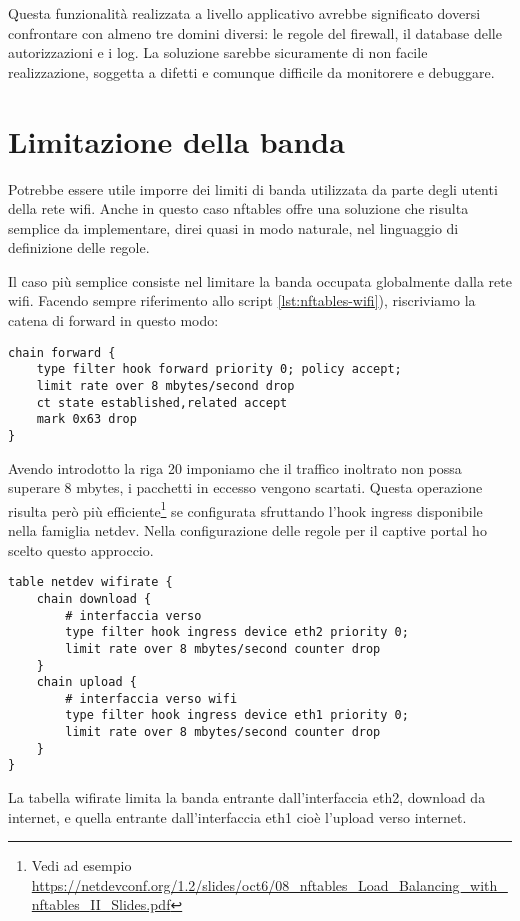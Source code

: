 Questa funzionalit\`a realizzata a livello applicativo avrebbe significato
doversi confrontare con almeno tre domini diversi: le regole del firewall, il
database delle autorizzazioni e i log. La soluzione sarebbe sicuramente di non
facile realizzazione, soggetta a difetti e comunque difficile da monitorere e
debuggare.

\section{Limitazione della banda}

Potrebbe essere utile imporre dei limiti di banda utilizzata da parte degli
utenti della rete wifi. Anche in questo caso nftables offre una soluzione che
risulta semplice da implementare, direi quasi in modo naturale, nel linguaggio
di definizione delle regole.

Il caso pi\`u semplice consiste nel limitare la banda occupata globalmente
dalla rete wifi.
Facendo sempre riferimento allo script \ref{lst:nftables-wifi}), riscriviamo
la catena di forward in questo modo:

\begin{lstlisting}[style=customc,firstnumber=18]
chain forward {
    type filter hook forward priority 0; policy accept;
    limit rate over 8 mbytes/second drop
    ct state established,related accept
    mark 0x63 drop
}
\end{lstlisting}
Avendo introdotto la riga 20 imponiamo che il traffico inoltrato non possa
superare 8 mbytes, i pacchetti in eccesso vengono scartati.
Questa operazione risulta per\`o  pi\`u efficiente\footnote{Vedi ad esempio
\url{https://netdevconf.org/1.2/slides/oct6/08\_nftables\_Load\_Balancing\_with\_nftables\_II\_Slides.pdf}}
se configurata sfruttando l'hook ingress disponibile nella famiglia netdev.
Nella configurazione delle regole per il captive portal ho scelto questo
approccio.
\begin{lstlisting}[style=customc,firstnumber=18]
table netdev wifirate {
    chain download {
        # interfaccia verso
        type filter hook ingress device eth2 priority 0;
        limit rate over 8 mbytes/second counter drop
    }
    chain upload {
        # interfaccia verso wifi
        type filter hook ingress device eth1 priority 0;
        limit rate over 8 mbytes/second counter drop
    }
}
\end{lstlisting}
La tabella wifirate limita la banda entrante dall'interfaccia eth2, download da internet,
e quella entrante dall'interfaccia eth1 cio\`e l'upload verso internet.

